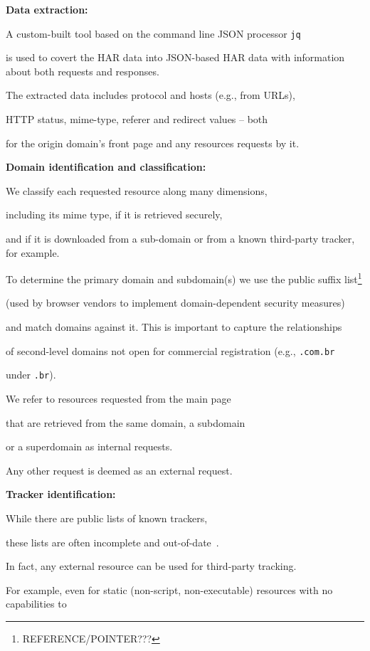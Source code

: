 \documentclass{sig-alternate-10pt}
\begin{document}
{\bf Data extraction:}

A custom-built tool based on the command line JSON processor \texttt{jq}

is used to covert the HAR data into JSON-based HAR data with information about both requests and responses.

The extracted data includes protocol and hosts (e.g., from URLs), 

HTTP status, mime-type, referer and redirect values – both

for the origin domain's front page and any resources requests by it. 



{\bf Domain identification and classification:}

We classify each requested resource along many dimensions, 

including its mime type, if it is retrieved securely,

and if it is downloaded from a sub-domain or from a known third-party tracker, for example. 

To determine the primary domain and subdomain(s) we use the public suffix list\footnote{REFERENCE/POINTER???} 

(used by browser vendors to implement domain-dependent security measures)

and match domains against it.  This is important to capture the relationships

of second-level domains not open for commercial registration (e.g., \texttt{.com.br}

under \texttt{.br}).  

We refer to resources requested from the main page

that are retrieved from the same domain, a subdomain

or a superdomain as internal requests.

Any other request is deemed as an external request.



{\bf Tracker identification:}

While there are public lists of known trackers, 


these lists are often incomplete and out-of-date~\cite{ref35, ref22}.

In fact,  any external resource can be used for third-party tracking.

For example, even for static (non-script, non-executable) resources with no capabilities to
\end{document}
